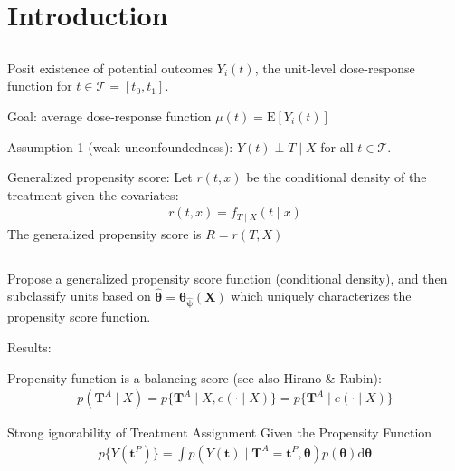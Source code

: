 \documentclass[12pt]{article}
\newcommand{\E}{\mathrm{E}}
\newcommand{\T}{\mathbf{T}}
\newcommand{\dd}{\mathrm{d}}
\newcommand{\bt}{\mathbf{t}}
\newcommand{\btheta}{\bm{\theta}}
\begin{document}

\section{Introduction}
\label{sec:intro}



\subsection{\cite{Hirano2004}}

Posit existence of potential outcomes $Y_i(t)$, the unit-level
dose-response function for $t \in \mathcal{T} = [t_0, t_1]$. 

Goal: average dose-response function $\mu(t) = \E [Y_i(t)]$

Assumption 1 (weak unconfoundedness): $Y(t) \perp T \mid X$ for all
$t \in \mathcal{T}$.

Generalized propensity score: Let $r(t, x)$ be the conditional density
of the treatment given the covariates:
\begin{align*}
  r(t, x) = f_{T \mid X}(t \mid x)
\end{align*}
The generalized propensity score is $R = r(T, X)$

\subsection{\cite{Imbens2000}}


\subsection{\cite{imai2004}  }

Propose a generalized propensity score function (conditional density),
and then subclassify units based on
$\hat{\bm{\theta}} = \bm{\theta}_{\hat{\bm{\psi}}}(\mathbf{X})$ which
uniquely characterizes the propensity score function.

Results:

Propensity function is a balancing score (see also Hirano \& Rubin):
\begin{align*}
  p(\T^{A} \mid X) = p\{\T^A \mid X, e(\cdot \mid X)\}
  = p\{\T^A \mid e(\cdot \mid X)\}
\end{align*}

Strong ignorability of Treatment Assignment Given the Propensity Function
\begin{align*}
  p\{Y(\bt^P)\} =
  \int p(Y(\bt) \mid \T^A = \bt^P, \btheta) p(\btheta) \dd \btheta
\end{align*}
\end{document}
